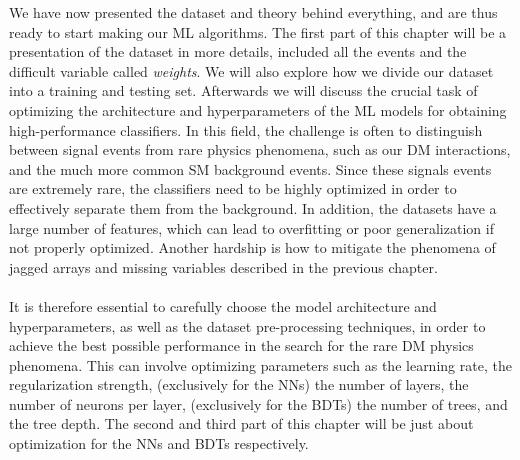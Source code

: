\documentclass[12pt, a4paper]{book}
\begin{document}
\label{chap:Method_ML}
We have now presented the dataset and theory behind everything, and are thus ready to start making our ML algorithms. The first part of this chapter will be a presentation of the dataset in more details, included all the events and the difficult variable called \textit{weights}.
We will also explore how we divide our dataset into a training and testing set. Afterwards we will discuss the crucial task of optimizing the architecture and hyperparameters of the ML models for obtaining high-performance classifiers. In this field, the challenge is often to 
distinguish between signal events from rare physics phenomena, such as our DM interactions, and the much more common SM background events. Since these signals events are extremely rare, the classifiers need to be highly optimized in order to effectively separate them from 
the background. In addition, the datasets have a large number of features, which can lead to overfitting or poor generalization if not properly optimized. Another hardship is how to mitigate the phenomena of jagged arrays and missing variables described in the previous chapter.\\
\\It is therefore essential to carefully choose the model architecture and hyperparameters, as well as the dataset pre-processing techniques, in order to achieve the best possible performance in the search for the rare DM physics phenomena. This can involve optimizing 
parameters such as the learning rate, the regularization strength, (exclusively for the NNs) the number of layers, the number of neurons per layer, (exclusively for the BDTs) the number of trees, and the tree depth. The second and third part of this chapter will be just about optimization for the NNs and BDTs respectively.

\clearpage
\end{document}
